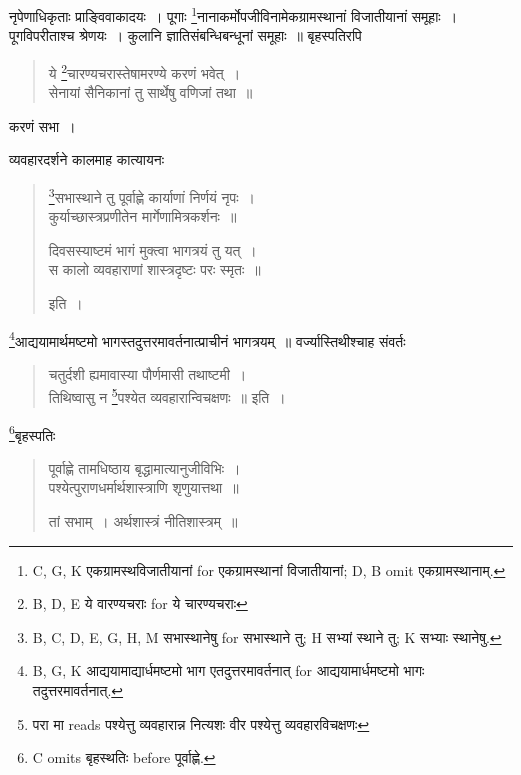 \documentclass[11pt, openany]{book}
\begin{document}
नृपेणाधिकृताः प्राङ्विवाकादयः~। पूगाः \renewcommand{\thefootnote}{4}\footnote{C, G, K एकग्रामस्थविजातीयानां for एकग्रामस्थानां विजातीयानां; D, B omit एकग्रामस्थानाम्.}नानाकर्मोपजीविनामेकग्रामस्थानां विजातीयानां समूहाः~। पूगविपरीताश्च श्रेणयः~। कुलानि ज्ञातिसंबन्धिबन्धूनां समूहाः~॥ बृहस्पतिरपि 

\vspace{-2mm}
\begin{quote}
{\vy ये \renewcommand{\thefootnote}{5}\footnote{B, D, E ये वारण्यचराः for ये चारण्यचराः}चारण्यचरास्तेषामरण्ये करणं भवेत्~।\\
सेनायां सैनिकानां तु सार्थेषु वणिजां तथा~॥}
\end{quote}

\newpage
{}

\noindent
करणं सभा~।

व्यवहारदर्शने कालमाह कात्यायनः

\begin{quote}
{\vy \renewcommand{\thefootnote}{1}\footnote{B, C, D, E, G, H, M सभास्थानेषु for सभास्थाने तु; H सभ्यां स्थाने तु; K सभ्याः स्थानेषु.}सभास्थाने तु पूर्वाह्णे कार्याणां निर्णयं नृपः~।\\
कुर्याच्छास्त्रप्रणीतेन मार्गेणामित्रकर्शनः~॥

दिवसस्याष्टमं भागं मुक्त्वा भागत्रयं तु यत्~।\\
स कालो व्यवहाराणां शास्त्रदृष्टः परः स्मृतः~॥} इति~।
\end{quote}

\renewcommand{\thefootnote}{2}\footnote{B, G, K आद्ययामाद्यार्धमष्टमो भाग एतदुत्तरमावर्तनात् for आद्ययामार्धमष्टमो भागः तदुत्तरमावर्तनात्.}आद्ययामार्थमष्टमो भागस्तदुत्तरमावर्तनात्प्राचीनं भागत्रयम्~॥ वर्ज्यास्तिथीश्चाह संवर्तः

\begin{quote}
{\vy चतुर्दशी ह्यमावास्या पौर्णमासी तथाष्टमी~।\\
तिथिष्वासु न \renewcommand{\thefootnote}{3}\footnote{परा मा reads पश्येत्तु व्यवहारान्न नित्यशः वीर {\qt पश्येत्तु व्यवहारविचक्षणः}}पश्येत व्यवहारान्विचक्षणः~॥} इति~।
\end{quote}

\renewcommand{\thefootnote}{4}\footnote{C omits बृहस्थतिः before पूर्वाह्णे.}बृहस्पतिः

\begin{quote}
{\vy पूर्वाह्णे तामधिष्ठाय बृद्धामात्यानुजीविभिः~।\\
पश्येत्पुराणधर्मार्थशास्त्राणि शृणुयात्तथा~॥

तां सभाम्~। अर्थशास्त्रं नीतिशास्त्रम्~॥}
\end{quote}
\end{document}
